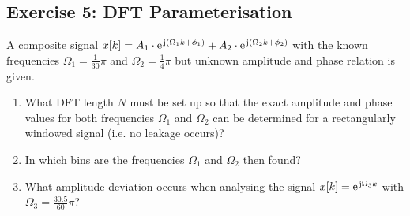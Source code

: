 \documentclass[11pt,a4paper,DIV=12]{scrartcl}
\begin{document}
\subsection*{Exercise 5: DFT Parameterisation}
A composite signal
$x[k]=A_1\cdot\e^{\im(\Omega_1 k+\phi_1)}+A_2\cdot\e^{\im(\Omega_2 k+\phi_2)}$
with the known frequencies $\Omega_1=\frac{1}{30}\pi$ and $\Omega_2=\frac{1}{4}\pi$
but unknown amplitude and phase relation is given.
%
\begin{enumerate}[label=\alph*)]
	\item What DFT length $N$ must be set up so that the exact amplitude and
	phase values for both frequencies $\Omega_1$ and $\Omega_2$ can be determined
	for a rectangularly windowed signal (i.e. no leakage occurs)?
%
	\item In which bins are the frequencies $\Omega_1$ and $\Omega_2$ then found?
%
	\item What amplitude deviation occurs when analysing the signal
	$x[k]=\e^{\im\Omega_3k}$ with $\Omega_3=\frac{30.5}{60}\pi$?
\end{enumerate}
\end{document}
